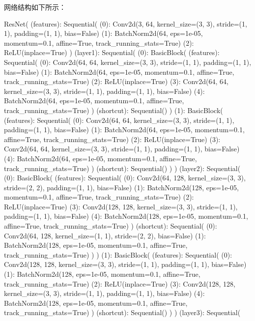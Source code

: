 \documentclass[UTF8,a4paper,10pt]{ctexart}
\begin{document}
网络结构如下所示：

\begin{python}
    ResNet(
  (features): Sequential(
    (0): Conv2d(3, 64, kernel_size=(3, 3), stride=(1, 1), padding=(1, 1), bias=False)
    (1): BatchNorm2d(64, eps=1e-05, momentum=0.1, affine=True, track_running_stats=True)
    (2): ReLU(inplace=True)
  )
  (layer1): Sequential(
    (0): BasicBlock(
      (features): Sequential(
        (0): Conv2d(64, 64, kernel_size=(3, 3), stride=(1, 1), padding=(1, 1), bias=False)
        (1): BatchNorm2d(64, eps=1e-05, momentum=0.1, affine=True, track_running_stats=True)
        (2): ReLU(inplace=True)
        (3): Conv2d(64, 64, kernel_size=(3, 3), stride=(1, 1), padding=(1, 1), bias=False)
        (4): BatchNorm2d(64, eps=1e-05, momentum=0.1, affine=True, track_running_stats=True)
      )
      (shortcut): Sequential()
    )
    (1): BasicBlock(
      (features): Sequential(
        (0): Conv2d(64, 64, kernel_size=(3, 3), stride=(1, 1), padding=(1, 1), bias=False)
        (1): BatchNorm2d(64, eps=1e-05, momentum=0.1, affine=True, track_running_stats=True)
        (2): ReLU(inplace=True)
        (3): Conv2d(64, 64, kernel_size=(3, 3), stride=(1, 1), padding=(1, 1), bias=False)
        (4): BatchNorm2d(64, eps=1e-05, momentum=0.1, affine=True, track_running_stats=True)
      )
      (shortcut): Sequential()
    )
  )
  (layer2): Sequential(
    (0): BasicBlock(
      (features): Sequential(
        (0): Conv2d(64, 128, kernel_size=(3, 3), stride=(2, 2), padding=(1, 1), bias=False)
        (1): BatchNorm2d(128, eps=1e-05, momentum=0.1, affine=True, track_running_stats=True)
        (2): ReLU(inplace=True)
        (3): Conv2d(128, 128, kernel_size=(3, 3), stride=(1, 1), padding=(1, 1), bias=False)
        (4): BatchNorm2d(128, eps=1e-05, momentum=0.1, affine=True, track_running_stats=True)
      )
      (shortcut): Sequential(
        (0): Conv2d(64, 128, kernel_size=(1, 1), stride=(2, 2), bias=False)
        (1): BatchNorm2d(128, eps=1e-05, momentum=0.1, affine=True, track_running_stats=True)
      )
    )
    (1): BasicBlock(
      (features): Sequential(
        (0): Conv2d(128, 128, kernel_size=(3, 3), stride=(1, 1), padding=(1, 1), bias=False)
        (1): BatchNorm2d(128, eps=1e-05, momentum=0.1, affine=True, track_running_stats=True)
        (2): ReLU(inplace=True)
        (3): Conv2d(128, 128, kernel_size=(3, 3), stride=(1, 1), padding=(1, 1), bias=False)
        (4): BatchNorm2d(128, eps=1e-05, momentum=0.1, affine=True, track_running_stats=True)
      )
      (shortcut): Sequential()
    )
  )
  (layer3): Sequential(

\end{python}
\end{document}
